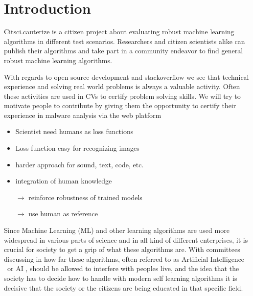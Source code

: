 \chapter{Introduction}\label{ch:introduction}
Citsci.cauterize is a citizen project about evaluating robust machine learning algorithms in different test scenarios.
Researchers and citizen scientists alike can publish their algorithms and take part in a community endeavor to find general robust machine learning algorithms.

With regards to open source development and stackoverflow we see that technical experience and solving real world problems is always a valuable activity.
Often these activities are used in CVs to certify problem solving skills.
We will try to motivate people to contribute by giving them the opportunity to certify their experience in malware analysis via the web platform

\begin{itemize}
    \item Scientist need humans as loss functions
    \item Loss function easy for recognizing images
\end{itemize}

\begin{itemize}
    \item harder approach for sound, text, code, etc.
    \item integration of human knowledge
            
    $\rightarrow$ reinforce robustness of trained models

    $\rightarrow$ use human as reference
\end{itemize}

Since Machine Learning (ML) and other learning algorithms are used more widespread in various parts of science and in all kind of different enterprises, it is crucial for society to get a grip of what these algorithms are.
With committees discussing in how far these algorithms, often referred to as \glqq Artificial Intelligence \grqq \ or \glqq AI \grqq, should be allowed to interfere with peoples live, and the idea that the society has to decide how to handle with modern self learning algorithms it is decisive that the society or the citizens are being educated in that specific field.

